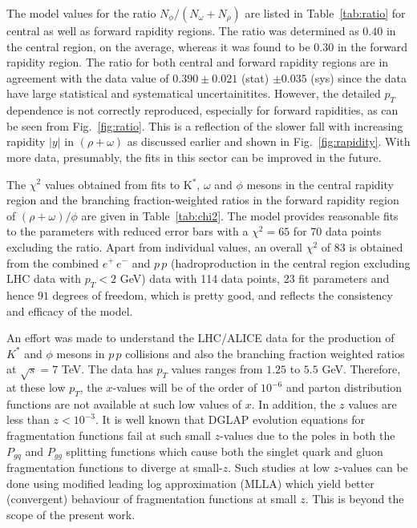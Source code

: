 \documentclass{ws-ijmpa}
\def\om{{\omega}}
\def\ph{{\phi}}
\begin{document}
The model values for the ratio $N_{\phi}/(N_{\om} + N_{\rho})$ are
listed in Table~\ref{tab:ratio} for central as well as forward rapidity
regions. The ratio was determined as $0.40$ in the central region,
on the average, whereas it was found to be $0.30$ in the forward
rapidity region. The ratio for both central and forward rapidity
regions are in agreement with the data value of $0.390 \pm 0.021$
(stat) $\pm 0.035$ (sys) since the data have large statistical and
systematical uncertainitites. However, the detailed $p_T$ dependence
is not correctly reproduced, especially for forward rapidities, as can
be seen from Fig.~\ref{fig:ratio}. This is a reflection of the slower
fall with increasing rapidity $\vert y \vert$ in $(\rho + \omega)$ as
discussed earlier and shown in Fig.~\ref{fig:rapidity}. With more data,
presumably, the fits in this sector can be improved in the future.


The $\chi^2$ values obtained from fits to K$^*$, $\om$ and $\phi$ mesons
in the central rapidity region and the branching fraction-weighted
ratios in the forward rapidity region of $(\rho+\omega)/\phi$ are given in Table~\ref{tab:chi2}. 
The model provides reasonable fits to the parameters with reduced error 
bars with a $\chi^2 = 65$ for 70 data points excluding the ratio.
Apart from
individual values, an overall $\chi^2$ of $83$ is obtained from the
combined $e^+\,e^-$ and $p\,p$ (hadroproduction in the central region
excluding LHC data with $p_T < 2$ GeV) data with 114 data points, 23 fit
parameters and hence  $91$ degrees of freedom,  which is pretty 
good, and reflects the consistency and efficacy of the model.

An effort was made to understand the LHC/ALICE data\cite{LHC} for the
production of $K^*$ and $\ph$ mesons in $p\,p$ collisions
and also the branching fraction weighted ratios at $\sqrt{s} = 7$ TeV.
The data has $p_T$ values ranges from $1.25$ to $5.5$
GeV. Therefore, at these low $p_T$, the $x$-values will be of the
order of $10^{-6}$ and parton distribution functions are not available
at such low values of $x$. In addition, the $z$ values are less than $z
< 10^{-3}$. It is well known that DGLAP evolution equations for
fragmentation functions
fail at such small $z$-values due to the poles in both the $P_{gq}$
and $P_{gg}$ splitting functions which cause both the singlet quark and
gluon fragmentation functions to diverge at small-$z$. Such studies at low
$z$-values can be done using modified leading log approximation
(MLLA)\cite{Indu} which yield better (convergent) behaviour of fragmentation
functions at small $z$. This is beyond the scope of the present work.
\end{document}
